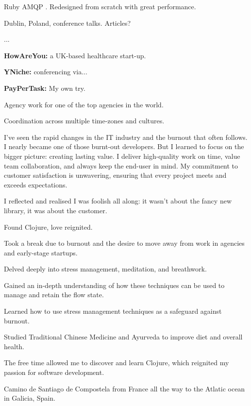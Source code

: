 \startitemize
  \item Ruby AMQP . Redesigned from scratch with great performance.
  \item Dublin, Poland, conference talks. Articles?
  \item ...
\stopitemize

\startitemize
  \item {\bf HowAreYou:} a UK-based healthcare start-up.
  \item {\bf YNiche:} conferencing via...
  \item {\bf PayPerTask:} My own try.
\stopitemize

\startitemize
  \item Agency work for one of the top agencies in the world.
  \item Coordination across multiple time-zones and cultures.
\stopitemize

I’ve seen the rapid changes in the IT industry and the burnout that often follows. I nearly became one of those burnt-out developers. But I learned to focus on the bigger picture: creating lasting value. I deliver high-quality work on time, value team collaboration, and always keep the end-user in mind. My commitment to customer satisfaction is unwavering, ensuring that every project meets and exceeds expectations.

I reflected and realised I was foolish all along: it wasn't about the fancy new library, it was about the customer.

Found Clojure, love reignited.

\startitemize[before={}, after={}]
  \item Took a break due to burnout and the desire to move away from work in agencies and early-stage startups.
  \item Delved deeply into stress management, meditation, and breathwork.
  \item Gained an in-depth understanding of how these techniques can be used to manage and retain the flow state.
  \item Learned how to use stress management techniques as a safeguard against burnout.
  \item Studied Traditional Chinese Medicine and Ayurveda to improve diet and overall health.
  \item The free time allowed me to discover and learn Clojure, which reignited my passion for software development.
  \item Camino de Santiago de Compostela from France all the way to the Atlatic ocean in Galicia, Spain.
\stopitemize

